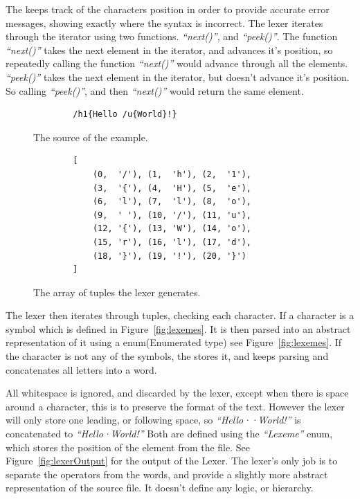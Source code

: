 The \compiler{} keeps track of the characters position in order to provide accurate error messages, showing exactly where the syntax is incorrect. The lexer iterates through the iterator using two functions. \textit{``next()''}, and \textit{``peek()''}. The function \textit{``next()''} takes the next element in the iterator, and advances it's position, so repeatedly calling the function \textit{``next()''} would advance through all the elements. \textit{``peek()''} takes the next element in the iterator, but doesn't advance it's position. So calling \textit{``peek()''}, and then \textit{``next()''} would return the same element.

\begin{figure}[!htbp]
    \begin{verbatim}
        /h1{Hello /u{World}!}
    \end{verbatim}
    \caption{The source of the example.}
    \label{fig:sampleProgram}
\end{figure}

\begin{figure}[!htbp]
    \begin{verbatim}
        [
            (0,  '/'), (1,  'h'), (2,  '1'), 
            (3,  '{'), (4,  'H'), (5,  'e'), 
            (6,  'l'), (7,  'l'), (8,  'o'),
            (9,  ' '), (10, '/'), (11, 'u'),
            (12, '{'), (13, 'W'), (14, 'o'),
            (15, 'r'), (16, 'l'), (17, 'd'),
            (18, '}'), (19, '!'), (20, '}')
        ]
    \end{verbatim}
    \caption{The array of tuples the lexer generates.}
    \label{fig:charIndices}
\end{figure}


The lexer then iterates through tuples, checking each character. If a character is a symbol which is defined in Figure~\ref{fig:lexemes}. It is then parsed into an abstract representation of it using a enum(Enumerated type) see Figure~\ref{fig:lexemes}. If the character is not any of the symbols, the \compiler stores it, and keeps parsing and concatenates all letters into a word.

All whitespace is ignored, and discarded by the lexer, except when there is space around a character, this is to preserve the format of the text. However the lexer will only store one leading, or following space, so \textit{``Hello··World!''} is concatenated to \textit{``Hello·World!''} Both are defined using the \textit{``Lexeme''} enum, which stores the position of the element from the file. See Figure~\ref{fig:lexerOutput} for the output of the Lexer. The lexer's only job is to separate the operators from the words, and provide a slightly more abstract representation of the source file. It doesn't define any logic, or hierarchy.

